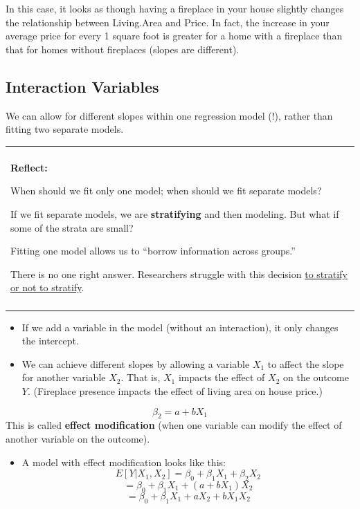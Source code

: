 \documentclass[
]{book}
\providecommand{\tightlist}{%
  \setlength{\itemsep}{0pt}\setlength{\parskip}{0pt}}
\newenvironment{reflect}
{
    \begin{center}
    
    \begin{tabular}{|p{0.8\textwidth}|}
    \rowcolor{LightBlue}
    \hline\\
    \rowcolor{LightBlue}
    \textbf{Reflect:}
}
{
    \\\rowcolor{LightBlue}
    \\\hline
    \end{tabular} 
    \end{center}
}
\begin{document}
In this case, it looks as though having a fireplace in your house slightly changes the relationship between Living.Area and Price. In fact, the increase in your average price for every 1 square foot is greater for a home with a fireplace than that for homes without fireplaces (slopes are different).

\subsection{Interaction Variables}\label{interaction-variables}

We can allow for different slopes within one regression model (!), rather than fitting two separate models.

\begin{reflect}
When should we fit only one model; when should we fit separate models?

If we fit separate models, we are \textbf{stratifying} and then
modeling. But what if some of the strata are small?

Fitting one model allows us to ``borrow information across groups.''

There is no one right answer. Researchers struggle with this decision
\href{https://www.ncbi.nlm.nih.gov/pubmed/22125224}{to stratify or not
to stratify}.
\end{reflect}

\begin{itemize}
\item
  If we add a variable in the model (without an interaction), it only changes the intercept.
\item
  We can achieve different slopes by allowing a variable \(X_1\) to affect the slope for another variable \(X_2\). That is, \(X_1\) impacts the effect of \(X_2\) on the outcome \(Y\). (Fireplace presence impacts the effect of living area on house price.)
\end{itemize}

\[\beta_2 = a + bX_1\]
This is called \textbf{effect modification} (when one variable can modify the effect of another variable on the outcome).

\begin{itemize}
\tightlist
\item
  A model with effect modification looks like this:
  \[E[Y | X_1, X_2] = \beta_0 + \beta_1X_{1} + \beta_2X_{2} \]
  \[= \beta_0 + \beta_1X_{1} + (a+bX_1)X_{2}\]
  \[ = \beta_0 + \beta_1X_{1} +aX_2+bX_1X_{2}\]
\end{itemize}
\end{document}
